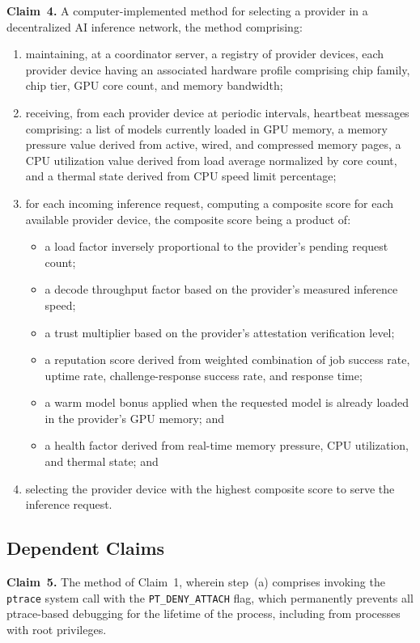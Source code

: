 \documentclass[11pt,letterpaper]{article}
\begin{document}
\textbf{Claim~4.} A computer-implemented method for selecting a provider in a decentralized AI inference network, the method comprising:

\begin{enumerate}[label=(\alph*),nosep]
\item maintaining, at a coordinator server, a registry of provider devices, each provider device having an associated hardware profile comprising chip family, chip tier, GPU core count, and memory bandwidth;
\item receiving, from each provider device at periodic intervals, heartbeat messages comprising: a list of models currently loaded in GPU memory, a memory pressure value derived from active, wired, and compressed memory pages, a CPU utilization value derived from load average normalized by core count, and a thermal state derived from CPU speed limit percentage;
\item for each incoming inference request, computing a composite score for each available provider device, the composite score being a product of:
  \begin{itemize}[nosep]
  \item a load factor inversely proportional to the provider's pending request count;
  \item a decode throughput factor based on the provider's measured inference speed;
  \item a trust multiplier based on the provider's attestation verification level;
  \item a reputation score derived from weighted combination of job success rate, uptime rate, challenge-response success rate, and response time;
  \item a warm model bonus applied when the requested model is already loaded in the provider's GPU memory; and
  \item a health factor derived from real-time memory pressure, CPU utilization, and thermal state; and
  \end{itemize}
\item selecting the provider device with the highest composite score to serve the inference request.
\end{enumerate}

\subsection{Dependent Claims}

\textbf{Claim~5.} The method of Claim~1, wherein step~(a) comprises invoking the \texttt{ptrace} system call with the \texttt{PT\_DENY\_ATTACH} flag, which permanently prevents all ptrace-based debugging for the lifetime of the process, including from processes with root privileges.
\end{document}
